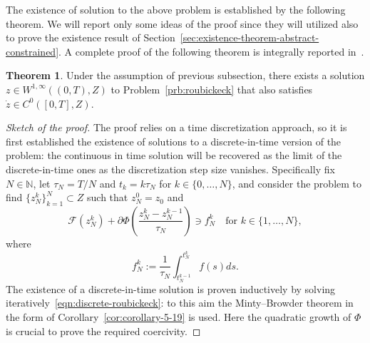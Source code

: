 \documentclass[a4paper,10pt,twoside]{amsbook}
\numberwithin{section}{chapter}
\numberwithin{equation}{chapter}
\theoremstyle{definition}
\newtheorem{thm}[prop]{Theorem}
\begin{document}
The existence of solution to the above problem is established by the following theorem. We will report only some ideas of the proof since they will utilized also to prove the existence result of Section~\ref{sec:existence-theorem-abstract-constrained}. A complete proof of the following theorem is integrally reported in~\cite[Proposition 11.1]{roubicek-pde}.
\begin{thm}
Under the assumption of previous subsection, there exists a solution $z\in W^{1,\infty}((0,T),Z)$ to Problem~\ref{prb:roubickeck} that also satisfies $\dot z\in C^0([0,T],Z)$.
\end{thm}
\begin{proof}[Sketch of the proof]
The proof relies on a time discretization approach, so it is first established the existence of solutions to a discrete-in-time version of the problem: the continuous in time solution will be recovered as the limit of the discrete-in-time ones as the discretization step size vanishes. Specifically fix $N\in\mathbb{N}$, let $\tau_N=T/N$ and $t_k=k\tau_N$ for $k\in\{0,\dots,N\}$, and consider the problem to find $\{z_N^k\}_{k=1}^N\subset Z$ such that $z_N^0=z_0$ and
\begin{equation}
\label{eqn:discrete-roubickeck}
\mathcal{F}(z_N^k)+\partial\Phi\left(\frac{z_N^k-z_N^{k-1}}{\tau_N}\right)\ni f_N^k\quad\text{for $k\in\{1,\dots,N\}$},
\end{equation}
where
\[
f_N^k:=\frac{1}{\tau_N}\int_{t_N^{k-1}}^{t_N^k}f(s)ds.
\]
The existence of a discrete-in-time solution is proven inductively by solving iteratively~\eqref{eqn:discrete-roubickeck}: to this aim the Minty--Browder theorem in the form of Corollary~\ref{cor:corollary-5-19} is used. Here the quadratic growth of $\Phi$ is crucial to prove the required coercivity.


\end{proof}
\end{document}
